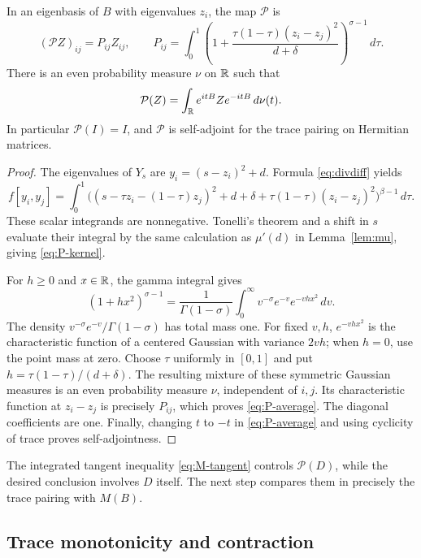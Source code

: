 \begin{lemma}\label{lem:average}
In an eigenbasis of $B$ with eigenvalues $z_i$, the map $\mathcal P$ is
\begin{equation}\label{eq:P-kernel}
 (\mathcal P Z)_{ij}=P_{ij}Z_{ij},\qquad
 P_{ij}=\int_0^1
 \left(1+\frac{\tau(1-\tau)(z_i-z_j)^2}{d+\delta}\right)^{\sigma-1}\,d\tau.
\end{equation}
There is an even probability measure $\nu$ on $\mathbb R$ such that
\begin{equation}\label{eq:P-average}
 \mathcal P(Z)=\int_\mathbb R e^{itB}Ze^{-itB}\,d\nu(t).
\end{equation}
In particular $\mathcal P(I)=I$, and $\mathcal P$ is self-adjoint for the
trace pairing on Hermitian matrices.
\end{lemma}
\begin{proof}
The eigenvalues of $Y_s$ are $y_i=(s-z_i)^2+d$. Formula
\eqref{eq:divdiff} yields
\[
 f[y_i,y_j]=\int_0^1
 \bigl((s-\tau z_i-(1-\tau)z_j)^2+d+\delta
       +\tau(1-\tau)(z_i-z_j)^2\bigr)^{\beta-1}\,d\tau.
\]
These scalar integrands are nonnegative. Tonelli's theorem and a shift in
$s$ evaluate their integral by the same calculation as $\mu'(d)$ in
Lemma~\ref{lem:mu}, giving \eqref{eq:P-kernel}.

For $h\ge0$ and $x\in\mathbb R$, the gamma integral gives
\begin{equation}\label{eq:gamma-mixture}
 (1+hx^2)^{\sigma-1}
 =\frac1{\Gamma(1-\sigma)}
   \int_0^\infty v^{-\sigma}e^{-v}e^{-vhx^2}\,dv.
\end{equation}
The density $v^{-\sigma}e^{-v}/\Gamma(1-\sigma)$ has total mass one.
For fixed $v,h$, $e^{-vhx^2}$ is the characteristic function of a centered
Gaussian with variance $2vh$; when $h=0$, use the point mass at zero.
Choose $\tau$ uniformly in $[0,1]$ and put $h=\tau(1-\tau)/(d+\delta)$.
The resulting mixture of these symmetric Gaussian measures is an even
probability measure $\nu$, independent of $i,j$. Its characteristic
function at $z_i-z_j$ is precisely $P_{ij}$, which proves
\eqref{eq:P-average}. The diagonal coefficients are one. Finally, changing
$t$ to $-t$ in \eqref{eq:P-average} and using cyclicity of trace proves
self-adjointness.
\end{proof}

The integrated tangent inequality \eqref{eq:M-tangent} controls
$\mathcal P(D)$, while the desired conclusion involves $D$ itself. The
next step compares them in precisely the trace pairing with $M(B)$.

\subsection{Trace monotonicity and contraction}

